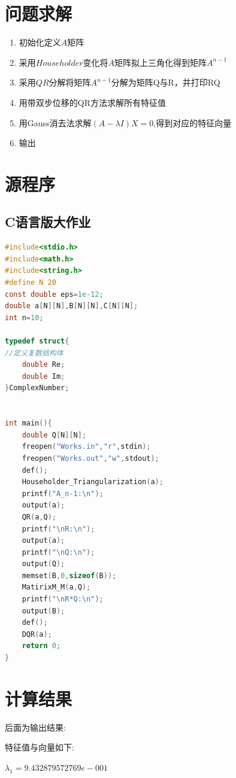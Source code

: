 \newpage
\chapter{问题求解}
\begin{enumerate}
\item 初始化定义$A$矩阵

\item 采用$Householder$变化将$A$矩阵拟上三角化得到矩阵$A^{n-1}$

\item 采用$QR$分解将矩阵$A^{n-1}$分解为矩阵Q与R，并打印RQ

\item 用带双步位移的QR方法求解所有特征值

\item 用Gauss消去法求解$(A-\lambda I)X=0$,得到对应的特征向量

\item 输出
\end{enumerate}
\newpage


\chapter{源程序}
\section{C语言版大作业}
\begin{lstlisting}[language=C]
#include<stdio.h>
#include<math.h>
#include<string.h>
#define N 20
const double eps=1e-12;
double a[N][N],B[N][N],C[N][N];
int n=10;

typedef struct{
//定义复数结构体
    double Re;
    double Im;
}ComplexNumber;


int main(){
	double Q[N][N];
	freopen("Works.in","r",stdin);
	freopen("Works.out","w",stdout);
	def();
	Householder_Triangularization(a);
	printf("A_n-1:\n");
	output(a);
	QR(a,Q);
	printf("\nR:\n");
	output(a);
	printf("\nQ:\n");
	output(Q);
	memset(B,0,sizeof(B));
	MatirixM_M(a,Q);
	printf("\nR*Q:\n");
	output(B);
	def();
	DQR(a);
	return 0;
}
\end{lstlisting}




\chapter{计算结果}
后面为输出结果:
\newpage


\newpage
特征值与向量如下:

$\lambda_{1}= 9.432879572769e-001$ 

